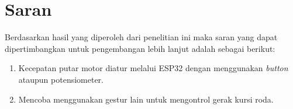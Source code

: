 \section{Saran}
\label{chap:saran}

Berdasarkan hasil yang diperoleh dari penelitian ini maka saran yang dapat dipertimbangkan untuk pengembangan lebih lanjut adalah sebagai berikut:

\begin{enumerate}[nolistsep]

  \item Kecepatan putar motor diatur melalui ESP32 dengan menggunakan \emph{button} ataupun potensiometer.

  \item Mencoba menggunakan gestur lain untuk mengontrol gerak kursi roda.

\end{enumerate}
